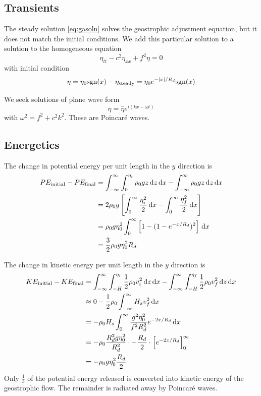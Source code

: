 \documentclass{jknotes}
\newcommand{\sgn}{\text{sgn}}
\begin{document}
\subsection{Transients}

The steady solution \eqref{eq:gasoln} solves the geostrophic adjustment
equation, but it does not match the initial conditions. We add this particular
solution to a solution to the homogeneous equation
\begin{equation}
	\eta_{tt} - c^2 \eta_{xx} + f^2 \eta = 0
\end{equation}
with initial condition
\begin{equation}
	\eta = \eta_0 \sgn(x) - \eta_{\text{steady}} = \eta_0
	e^{-\abs{x}/R_d}\sgn(x)
\end{equation}

We seek solutions of plane wave form
\begin{equation}
	\eta = \hat{\eta} e^{i(kx-\omega t)}
\end{equation}
with $\omega^2 = f^2 + c^2 k^2$. These are Poincar\'{e} waves.

\subsection{Energetics}
The change in potential energy per unit length in the $y$ direction is
\begin{align}
	PE_{\text{initial}} - PE_{\text{final}} &= \int_{-\infty}^\infty
	\int_0^{\eta_i} \rho_0 g z \, \diffd z \, \diffd x - \int_{-\infty}^\infty
	\rho_0 g z \, \diffd z\,\diffd x \\
	&= 2\rho_0 g \left[ \int_0^\infty \frac{\eta_i^2}{2}\,\diffd x -
\int_0^\infty \frac{\eta_f^2}{2}\,\diffd x \right] \\
&= \rho_0 g \eta_0^2 \int_0^\infty \left[ 1- (1-e^{-x/R_d})^2\right] \, \diffd
x\\
&= \frac{3}{2}\rho_0 g \eta_0^2 R_d
\end{align}

The change in kinetic energy per unit length in the $y$ direction is
\begin{align}
	KE_{\text{initial}} - KE_{\text{final}} &= \int_{-\infty}^\infty
	\int_{-H}^{\eta_i} \frac{1}{2} \rho_0 v_i^2 \,\diffd z\, \diffd x -
	\int_{-\infty}^\infty \int_{-H}^{\eta_f} \frac{1}{2} \rho_0 v_f^2 \,\diffd
	z\, \diffd x \\
	&\approx 0 - \frac{1}{2}\rho_0 \int_{-\infty}^\infty H_s v^2_f \, \diffd x
	\\
	&= -\rho_0 H_s \int_0^\infty \frac{g^2 \eta_0^2}{f^2 R_d^2} e^{-2x/R_d} \,
	\diffd x \\
	&= -\rho_0 \frac{R_d^2 g \eta_0^2}{R_d^2}\cdot -\frac{R_d}{2} \cdot \left[
e^{-2x/R_d} \right]_0^\infty \\
&= -\rho_0 g \eta_0^2 \frac{R_d}{2}
\end{align}
Only $\frac{1}{3}$ of the potential energy released is converted into kinetic
energy of the geostrophic flow. The remainder is radiated away by Poincar\'{e}
waves.
\end{document}
